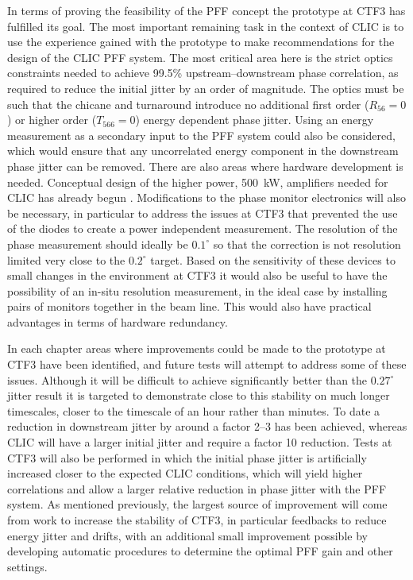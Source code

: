 In terms of proving the feasibility of the PFF concept the prototype at CTF3 has fulfilled its goal.  The most important remaining task in the context of CLIC is to use the experience gained with the prototype to make recommendations for the design of the CLIC PFF system. The most critical area here is the strict optics constraints needed to achieve 99.5\% upstream--downstream phase correlation, as required to reduce the initial jitter by an order of magnitude. The optics must be such that the chicane and turnaround introduce no additional first order (\(R_{56} = 0\)) or higher order (\(T_{566} = 0\)) energy dependent phase jitter. Using an energy measurement as a secondary input to the PFF system could also be considered, which would ensure that any uncorrelated energy component in the downstream phase jitter can be removed. There are also areas where hardware development is needed. Conceptual design of the higher power, 500~kW, amplifiers needed for CLIC has already begun \cite{colinCLIC16}. Modifications to the phase monitor electronics will also be necessary, in particular to address the issues at CTF3 that prevented the use of the diodes to create a power independent measurement. The resolution of the phase measurement should ideally be \(0.1^\circ\) so that the correction is not resolution limited very close to the \(0.2^\circ\) target. Based on the sensitivity of these devices to small changes in the environment at CTF3 it would also be useful to have the possibility of an in-situ resolution measurement, in the ideal case by installing pairs of monitors together in the beam line. This would also have practical advantages in terms of hardware redundancy.

In each chapter areas where improvements could be made to the prototype at CTF3 have been identified, and future tests will attempt to address some of these issues. Although it will be difficult to achieve significantly better than the \(0.27^\circ\) jitter result it is targeted to demonstrate close to this stability on much longer timescales, closer to the timescale of an hour rather than minutes. To date a reduction in downstream jitter by around a factor 2--3 has been achieved, whereas CLIC will have a larger initial jitter and require a factor 10 reduction. Tests at CTF3 will also be performed in which the initial phase jitter is artificially increased closer to the expected CLIC conditions, which will yield higher correlations and allow a larger relative reduction in phase jitter with the PFF system. As mentioned previously, the largest source of improvement will come from work to increase the stability of CTF3, in particular feedbacks to reduce energy jitter and drifts, with an additional small improvement possible by developing automatic procedures to determine the optimal PFF gain and other settings.

